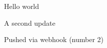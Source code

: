 \documentclass{article}
\begin{document}
Hello world

A second update

Pushed via webhook (number 2)
\end{document}
